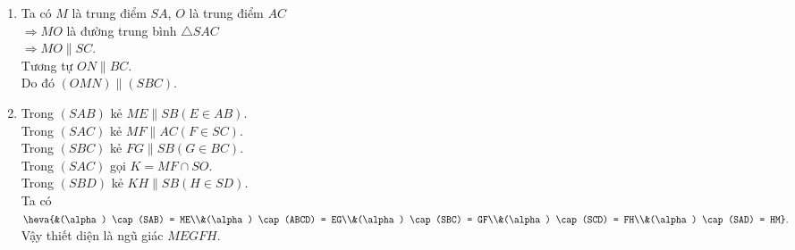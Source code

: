 \begin{bt}
{\begin{enumerate}
	\item Ta có $M$ là trung điểm $SA$, $O$ là trung điểm $AC$\\
	$\Rightarrow MO$ là đường trung bình $\triangle SAC$\\
	$\Rightarrow MO \parallel SC$.\\
	Tương tự $ON \parallel BC$.\\
	Do đó $(OMN) \parallel (SBC)$.
	\item Trong $(SAB )$  kẻ $ME \parallel SB (E \in AB)$.\\
	Trong $(SAC )$ kẻ $MF \parallel AC (F \in SC)$.\\
	Trong $(SBC )$ kẻ $FG \parallel SB (G \in BC)$.\\
	Trong $(SAC )$ gọi $K = MF \cap SO$.\\
	Trong $(SBD )$ kẻ $KH \parallel SB (H \in SD)$.\\
	Ta có $\heva{&(\alpha) \cap (SAB) = ME\\&(\alpha) \cap (ABCD) = EG\\&(\alpha) \cap (SBC) = GF\\&(\alpha) \cap (SCD) = FH\\&(\alpha) \cap (SAD) = HM}.$\\
	Vậy thiết diện là ngũ giác $MEGFH$.
	\end{enumerate}
}
\end{bt}

